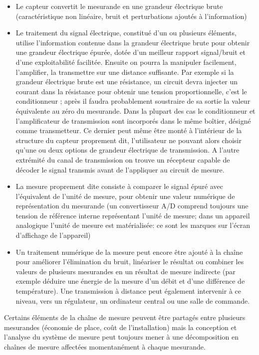 \begin{itemize}\itemsep1pt
\renewcommand{\labelitemi}{$\bullet$}
\item Le capteur  convertit le mesurande en une grandeur électrique brute (caractéristique non linéaire, bruit et perturbations ajoutés à l'information)
\item Le traitement du signal électrique, constitué d'un ou plusieurs éléments, utilise l'information contenue dans la grandeur électrique brute pour obtenir une grandeur électrique épurée, dotée d'un meilleur rapport signal/bruit et d'une exploitabilité facilitée. Ensuite on pourra la manipuler facilement, l'amplifier, la transmettre sur une distance suffisante. Par exemple si la grandeur électrique brute est une résistance, un circuit devra injecter un courant dans la résistance pour obtenir une tension proportionnelle, c'est le conditionneur ; après il faudra probablement soustraire de sa sortie la valeur équivalente au  zéro du mesurande. Dans la plupart des cas le conditionneur et l'amplificateur de transmission sont incorporés dans le même boîtier, désigné comme transmetteur. Ce dernier peut même être monté à l'intérieur de la structure du capteur proprement dit, l'utilisateur ne pouvant alors choisir qu'une ou deux options de grandeur électrique de transmission. A l'autre extrémité du canal de transmission on trouve un récepteur capable de décoder le signal transmis avant de l'appliquer au circuit de mesure.
\item La mesure  proprement dite consiste à comparer le signal épuré avec l'équivalent de l'unité de mesure,  pour obtenir une valeur numérique de représentation du mesurande (un convertisseur A/D comprend toujours une tension de référence interne représentant l'unité de mesure; dans un appareil analogique l'unité de mesure est matérialisée: ce sont les marques sur l'écran d'affichage de l'appareil)
\item Un traitement numérique  de la mesure peut encore être ajouté à la chaîne pour améliorer l'élimination du bruit, linéariser le résultat ou combiner les valeurs de plusieurs mesurandes en un résultat de mesure indirecte (par exemple déduire une énergie de la mesure d'un débit et d'une différence de température). Une transmission à distance peut également intervenir à ce niveau, vers un régulateur, un ordinateur central ou une salle de commande.
\end{itemize}
Certains éléments de la chaîne de mesure peuvent être partagés entre plusieurs mesurandes (économie de place, coût de l'installation) mais la conception et l'analyse du système de mesure peut toujours mener à une décomposition en  chaînes de mesure affectées momentanément à chaque mesurande.

